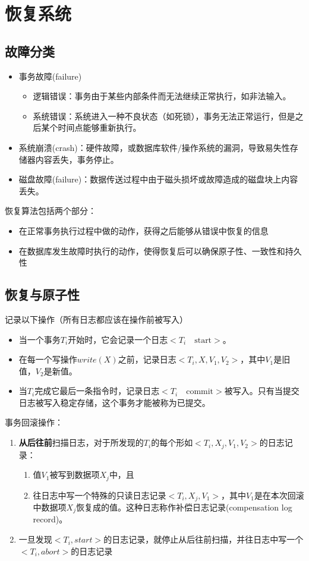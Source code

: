 
\section{恢复系统} %
\subsection{故障分类}
\begin{itemize}
	\item 事务故障(failure)
	\begin{itemize}
		\item 逻辑错误：事务由于某些内部条件而无法继续正常执行，如非法输入。
		\item 系统错误：系统进入一种不良状态（如死锁），事务无法正常运行，但是之后某个时间点能够重新执行。
	\end{itemize}
	\item 系统崩溃(crash)：硬件故障，或数据库软件/操作系统的漏洞，导致易失性存储器内容丢失，事务停止。
	\item 磁盘故障(failure)：数据传送过程中由于磁头损坏或故障造成的磁盘块上内容丢失。
\end{itemize}

恢复算法包括两个部分：
\begin{itemize}
	\item 在正常事务执行过程中做的动作，获得之后能够从错误中恢复的信息
	\item 在数据库发生故障时执行的动作，使得恢复后可以确保原子性、一致性和持久性
\end{itemize}

\subsection{恢复与原子性}
记录以下操作（所有日志都应该在操作前被写入）
\begin{itemize}
\item 当一个事务$T_i$开始时，它会记录一个日志$<T_i\quad\text{start}>$。
\item 在每一个写操作$write(X)$之前，记录日志$<T_i,X,V_1,V_2>$，其中$V_1$是旧值，$V_2$是新值。
\item 当$T_i$完成它最后一条指令时，记录日志$<T_i\quad\text{commit}>$被写入。只有当提交日志被写入稳定存储，这个事务才能被称为已提交。
\end{itemize}

事务回滚操作：
\begin{enumerate}
	\item \textbf{从后往前}扫描日志，对于所发现的$T_i$的每个形如$<T_i,X_j,V_1,V_2>$的日志记录：
	\begin{enumerate}
		\item 值$V_1$被写到数据项$X_j$中，且
		\item 往日志中写一个特殊的只读日志记录$<T_i,X_j,V_1>$，其中$V_1$是在本次回滚中数据项$X_j$恢复成的值。这种日志称作补偿日志记录(compensation log record)。
	\end{enumerate}
	\item 一旦发现$<T_i,start>$的日志记录，就停止从后往前扫描，并往日志中写一个$<T_i,abort>$的日志记录
\end{enumerate}

